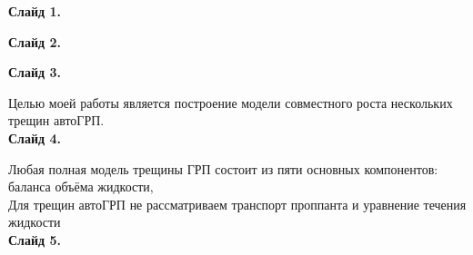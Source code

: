 \documentclass[a4paper, 12pt]{article}
\begin{document}

\textbf{Слайд 1.}

\textbf{Слайд 2.}

\textbf{Слайд 3.}

Целью моей работы является построение модели совместного роста нескольких трещин автоГРП.\\


\textbf{Слайд 4.}

Любая полная модель трещины ГРП состоит из пяти основных компонентов: баланса объёма жидкости, \\

Для трещин автоГРП не рассматриваем транспорт проппанта и уравнение течения жидкости\\

\textbf{Слайд 5.}





	
\end{document}
